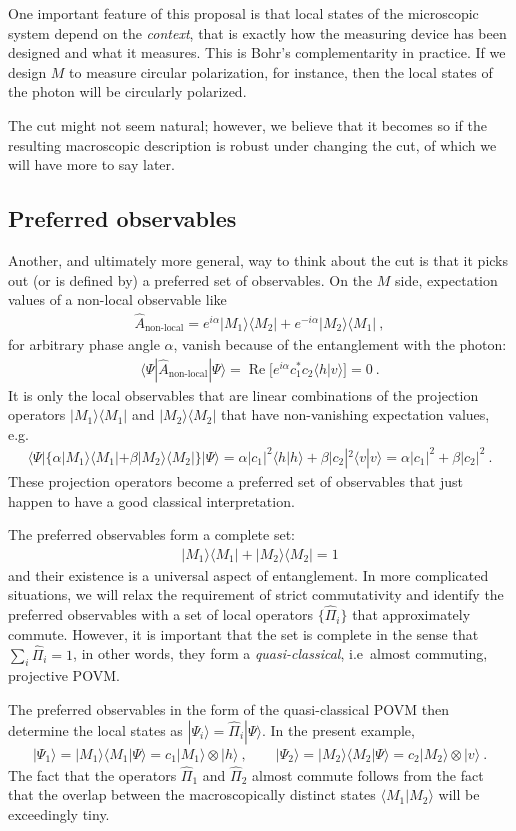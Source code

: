 \documentclass[12pt]{article}
\theoremstyle{plain}
\theoremstyle{definition}
\theoremstyle{remark}
\newcommand{\RE}{\operatorname{Re}}
\def\bra#1{\langle #1|}
\def\ket#1{| #1\rangle}
\newcommand{\EQ}[1]{\begin{equation}\begin{split} #1
\end{split}\end{equation}}
\begin{document}
One important feature of this proposal is that local states of the microscopic system depend on the {\it context\/}, that is exactly how the measuring device has been designed and what it measures. 
This is Bohr's complementarity in practice.
If we design $M$ to measure circular polarization, for instance, then the local states of the photon will be circularly polarized.  

The cut might not seem natural; however, we believe that it becomes so if the resulting macroscopic description is robust under changing the cut, of which we will have more to say later.

\subsection{Preferred observables}

Another, and ultimately more general, way to think about the cut is that it picks out (or is defined by) a preferred set of observables. On the $M$ side, expectation values of a non-local observable like
\EQ{
\hat A_\text{non-local}=e^{i\alpha}\ket{M_1}\bra{M_2}+e^{-i\alpha}\ket{M_2}\bra{M_1}\ ,
}
for arbitrary phase angle $\alpha$, vanish because of the entanglement with the photon:
\EQ{
\bra{\Psi}\hat A_\text{non-local}\ket{\Psi}=\RE\Big[e^{i\alpha}c_1^*c_2\bra{h}v\rangle\Big]=0\ .
\label{rrf}
}
It is only the local observables that are linear combinations of the projection operators $\ket{M_1}\bra{M_1}$ and $\ket{M_2}\bra{M_2}$ that have non-vanishing expectation values, e.g.
\EQ{
\bra{\Psi}\Big\{\alpha\ket{M_1}\bra{M_1}+\beta\ket{M_2}\bra{M_2}\Big\}\ket{\Psi}=\alpha|c_1|^2\bra{h}h\rangle+\beta|c_2|^2\bra{v}v\rangle=\alpha|c_1|^2+\beta|c_2|^2\ .
}
These projection operators become a preferred set of observables that just happen to have a good classical interpretation.

The preferred observables form a complete set:
\EQ{
\ket{M_1}\bra{M_1}+\ket{M_2}\bra{M_2}=1
} 
and their existence is a universal aspect of entanglement. 
In more complicated situations, we will relax the requirement of strict commutativity and identify the preferred observables with a set of local operators $\{\hat\Pi_i\}$ that approximately commute. However, it is important that the set is complete in the sense that $\sum_i\hat\Pi_i=1$, in other words, they form a {\it quasi-classical\/}, i.e~almost commuting, projective POVM.

The preferred observables in the form of the quasi-classical POVM then determine the local states as
$\ket{\Psi_i}=\hat\Pi_i\ket{\Psi}$. In the present example,
\EQ{
\ket{\Psi_1}=\ket{M_1}\bra{M_1}\Psi\rangle=c_1\ket{M_1}\otimes\ket{h}\ ,\qquad
\ket{\Psi_2}=\ket{M_2}\bra{M_2}\Psi\rangle=c_2\ket{M_2}\otimes\ket{v}\ .
}
The fact that the operators $\hat\Pi_1$ and $\hat\Pi_2$ almost commute follows from the fact that the overlap between the macroscopically distinct states $\bra{M_1}M_2\rangle$ will be exceedingly tiny.
\end{document}
